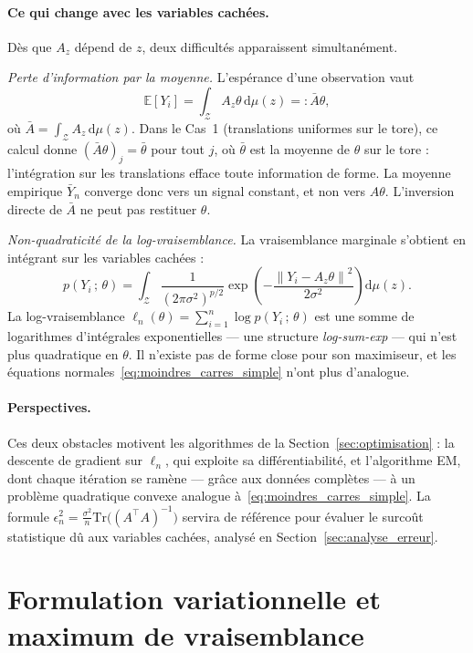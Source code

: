 \documentclass[12pt, a4paper]{article}
\theoremstyle{definition}
\newcommand{\E}{\mathbb{E}}
\newcommand{\Zcal}{\mathcal{Z}}
\newcommand{\norm}[1]{\left\|#1\right\|}
\newcommand{\Tr}{\mathrm{Tr}}
\begin{document}
\paragraph{Ce qui change avec les variables cachées.}
Dès que $A_z$ dépend de $z$, deux difficultés apparaissent simultanément.

\textit{Perte d'information par la moyenne.}
L'espérance d'une observation vaut
\[
    \E[Y_i] = \int_\Zcal A_z\theta\,\mathrm{d}\mu(z) =: \bar{A}\theta,
\]
où $\bar{A} = \int_\Zcal A_z\,\mathrm{d}\mu(z)$. Dans le Cas~1 (translations
uniformes sur le tore), ce calcul donne $(\bar{A}\theta)_j = \bar{\theta}$ pour
tout $j$, où $\bar{\theta}$ est la moyenne de $\theta$ sur le tore : l'intégration
sur les translations efface toute information de forme. La moyenne empirique
$\bar{Y}_n$ converge donc vers un signal constant, et non vers $A\theta$.
L'inversion directe de $\bar{A}$ ne peut pas restituer $\theta$.

\textit{Non-quadraticité de la log-vraisemblance.}
La vraisemblance marginale s'obtient en intégrant sur les variables cachées :
\[
    p(Y_i\,;\,\theta)
    = \int_\Zcal \frac{1}{(2\pi\sigma^2)^{p/2}}
      \exp\!\left(-\frac{\norm{Y_i - A_z\theta}^2}{2\sigma^2}\right)\mathrm{d}\mu(z).
\]
La log-vraisemblance $\ell_n(\theta) = \sum_{i=1}^n \log p(Y_i\,;\,\theta)$
est une somme de logarithmes d'intégrales exponentielles --- une structure
\textit{log-sum-exp} --- qui n'est plus quadratique en $\theta$. Il n'existe
pas de forme close pour son maximiseur, et les équations normales~\eqref{eq:moindres_carres_simple}
n'ont plus d'analogue.

\paragraph{Perspectives.}
Ces deux obstacles motivent les algorithmes de la Section~\ref{sec:optimisation} :
la descente de gradient sur $\ell_n$, qui exploite sa différentiabilité, et
l'algorithme EM, dont chaque itération se ramène --- grâce aux données complètes
--- à un problème quadratique convexe analogue à~\eqref{eq:moindres_carres_simple}.
La formule $\epsilon_n^2 = \frac{\sigma^2}{n}\Tr\bigl((A^\top A)^{-1}\bigr)$
servira de référence pour évaluer le surcoût statistique dû aux variables
cachées, analysé en Section~\ref{sec:analyse_erreur}.


\newpage
\section{Formulation variationnelle et maximum de vraisemblance}
\label{sec:mle}
\end{document}
